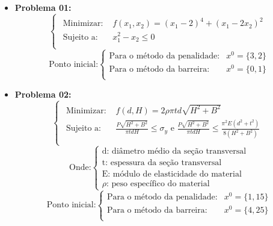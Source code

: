 \documentclass[10pt, a4paper]{article}
\begin{document}
\begin{itemize}
      \item
            \textbf{Problema 01:}
            \[
                  \begin{cases}
                        \begin{aligned}
                              \text{Minimizar:  }   & f(x_1, x_2) = (x_1-2)^4 + (x_1-2x_2)^2 \\
                              \text{Sujeito a:  }   & x_1^2 - x_2 \leq 0\\
                        \end{aligned}
                  \end{cases}
            \]
            \[
                  \text{Ponto inicial:}
                  \begin{cases}
                        \text{Para o m\'etodo da penalidade:} & x^0=\{3,2\}  \\
                        \text{Para o m\'etodo da barreira:} & x^0=\{0,1\}  \\
                  \end{cases}
            \]

            \item
            \textbf{Problema 02:}
            \[
                  \begin{cases}
                        \begin{aligned}
                              \text{Minimizar:  }     & f(d, H) = 2\rho \pi t d \sqrt{H^2+B^2}\\
                              \text{Sujeito a:  }     & \frac{P \sqrt{H^2+B^2}}{\pi t d H} \leq \sigma_y \text{ e } \frac{P \sqrt{H^2+B^2}}{\pi t d H} \leq \frac{\pi^2 E (d^2+t^2)}{8(H^2+B^2)}\\
                        \end{aligned}
                  \end{cases}
            \]
            \small
            \[
                  \text{Onde:} \begin{cases}
                        \text{d: di\^ametro m\'edio da se\c c\~ao transversal}\\
                        \text{t: espessura da se\c c\~ao transversal}\\
                        \text{E: m\'odulo de elasticidade do material}\\
                        \text{$\rho$: peso espec\'ifico do material}
                  \end{cases}
            \]
            \normalsize
            \[
                  \text{Ponto inicial:}
                  \begin{cases}
                        \text{Para o m\'etodo da penalidade:} & x^0=\{1,15\}  \\
                        \text{Para o m\'etodo da barreira:} & x^0=\{4,25\}  \\
                  \end{cases}
            \]
\end{itemize}
\end{document}
